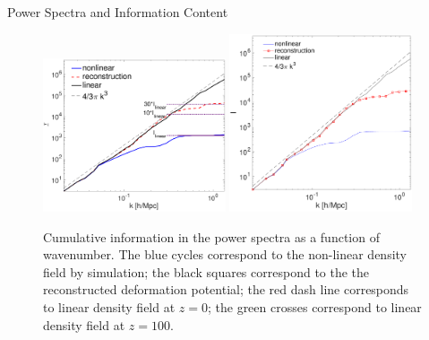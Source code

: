 \begin{section}{Power Spectra and Information Content}
\begin{figure}[t!]
\begin{center}
  \includegraphics[width=0.48\textwidth]{fisher_full-crop.pdf}
  \includegraphics[width=0.48\textwidth]{fisher_r2-crop.pdf}
   \caption{Cumulative information in the power spectra as a function of wavenumber. The blue 
cycles correspond to the non-linear density field by simulation; the black squares correspond 
to the the reconstructed deformation potential; the red dash line corresponds to linear density 
field at $z=0$; the green crosses correspond to linear density field at $z=100$.}
  \label{fig:fisherinfo}
 \end{center}
\end{figure}


\end{section}
